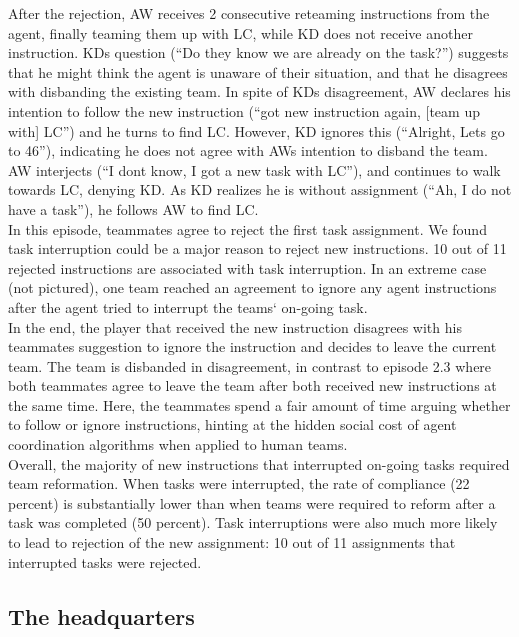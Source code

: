 After the rejection, AW receives 2 consecutive reteaming instructions from the agent, finally teaming them up with LC, while KD does not receive another instruction. KDs question (``Do they know we are already on the task?'') suggests that he might think the agent is unaware of their situation, and that he disagrees with disbanding the existing team. In spite of KDs disagreement, AW declares his intention to follow the new instruction (``got new instruction again, [team up with] LC'') and he turns to find LC. However, KD ignores this (``Alright, Lets go to 46''), indicating he does not agree with AWs intention to disband the team. AW interjects (``I dont know, I got a new task with LC''), and continues to walk towards LC, denying KD. As KD realizes he is without assignment (``Ah, I do not have a task''), he follows AW to find LC. \\

In this episode, teammates agree to reject the first task assignment. We found task interruption could be a major reason to reject new instructions. 10 out of 11 rejected instructions are associated with task interruption. In an extreme case (not pictured), one team reached an agreement to ignore any agent instructions after the agent tried to interrupt the teams` on-going task. \\

In the end, the player that received the new instruction disagrees with his teammates suggestion to ignore the instruction and decides to leave the current team. The team is disbanded in disagreement, in contrast to episode 2.3 where both teammates agree to leave the team after both received new instructions at the same time. Here, the teammates spend a fair amount of time arguing whether to follow or ignore instructions, hinting at the hidden social cost of agent coordination algorithms when applied to human teams. \\

Overall, the majority of new instructions that interrupted on-going tasks required team reformation. When tasks were interrupted, the rate of compliance (22 percent) is substantially lower than when teams were required to reform after a task was completed (50 percent). Task interruptions were also much more likely to lead to rejection of the new assignment: 10 out of 11 assignments that interrupted tasks were rejected.\\

\subsection{The headquarters}

